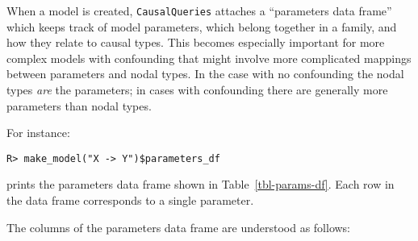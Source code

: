 \documentclass[
  11pt,
  article]{jss}
\begin{document}
When a model is created, \texttt{CausalQueries} attaches a ``parameters
data frame'' which keeps track of model parameters, which belong
together in a family, and how they relate to causal types. This becomes
especially important for more complex models with confounding that might
involve more complicated mappings between parameters and nodal types. In
the case with no confounding the nodal types \emph{are} the parameters;
in cases with confounding there are generally more parameters than nodal
types.

For instance:

\begin{verbatim}
R> make_model("X -> Y")$parameters_df
\end{verbatim}

\hypertarget{tbl-params-df}{}
\begin{table}
\caption{\label{tbl-params-df}Example of Parameters Data Frame }\tabularnewline

\centering
{}
\end{table}

prints the parameters data frame shown in Table~\ref{tbl-params-df}.
Each row in the data frame corresponds to a single parameter.

The columns of the parameters data frame are understood as follows:
\end{document}
